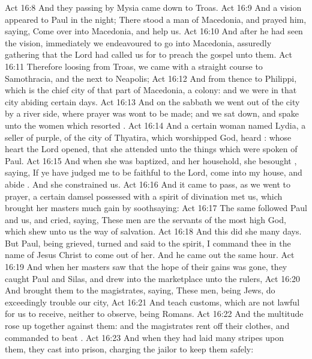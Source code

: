 \vs Act 16:8 And they passing by Mysia came down to Troas.
\vs Act 16:9 And a vision appeared to Paul in the night; There stood a man of Macedonia, and prayed him, saying, Come over into Macedonia, and help us.
\vs Act 16:10 And after he had seen the vision, immediately we endeavoured to go into Macedonia, assuredly gathering that the Lord had called us for to preach the gospel unto them.
\vs Act 16:11 Therefore loosing from Troas, we came with a straight course to Samothracia, and the next  to Neapolis;
\vs Act 16:12 And from thence to Philippi, which is the chief city of that part of Macedonia,  a colony: and we were in that city abiding certain days.
\vs Act 16:13 And on the sabbath we went out of the city by a river side, where prayer was wont to be made; and we sat down, and spake unto the women which resorted .
\vs Act 16:14 And a certain woman named Lydia, a seller of purple, of the city of Thyatira, which worshipped God, heard : whose heart the Lord opened, that she attended unto the things which were spoken of Paul.
\vs Act 16:15 And when she was baptized, and her household, she besought , saying, If ye have judged me to be faithful to the Lord, come into my house, and abide . And she constrained us.
\vs Act 16:16 And it came to pass, as we went to prayer, a certain damsel possessed with a spirit of divination met us, which brought her masters much gain by soothsaying:
\vs Act 16:17 The same followed Paul and us, and cried, saying, These men are the servants of the most high God, which shew unto us the way of salvation.
\vs Act 16:18 And this did she many days. But Paul, being grieved, turned and said to the spirit, I command thee in the name of Jesus Christ to come out of her. And he came out the same hour.
\vs Act 16:19 And when her masters saw that the hope of their gains was gone, they caught Paul and Silas, and drew  into the marketplace unto the rulers,
\vs Act 16:20 And brought them to the magistrates, saying, These men, being Jews, do exceedingly trouble our city,
\vs Act 16:21 And teach customs, which are not lawful for us to receive, neither to observe, being Romans.
\vs Act 16:22 And the multitude rose up together against them: and the magistrates rent off their clothes, and commanded to beat .
\vs Act 16:23 And when they had laid many stripes upon them, they cast  into prison, charging the jailor to keep them safely:
